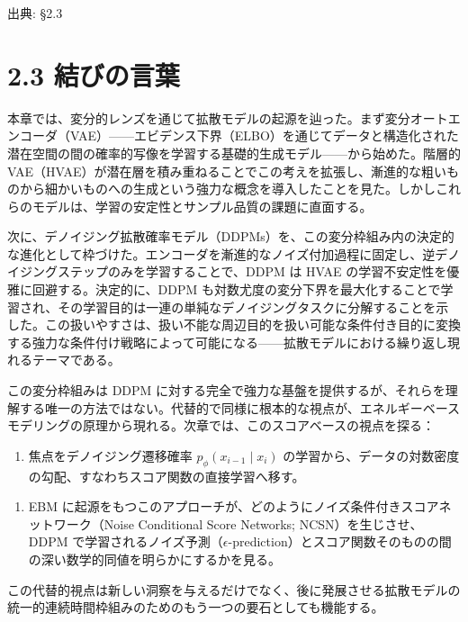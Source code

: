 

{\color{gray}\footnotesize 出典: §2.3\par}
\vspace{0.2em}

\section*{2.3 結びの言葉}


本章では、変分的レンズを通じて拡散モデルの起源を辿った。まず変分オートエンコーダ（VAE）——エビデンス下界（ELBO）を通じてデータと構造化された潜在空間の間の確率的写像を学習する基礎的生成モデル——から始めた。階層的 VAE（HVAE）が潜在層を積み重ねることでこの考えを拡張し、漸進的な粗いものから細かいものへの生成という強力な概念を導入したことを見た。しかしこれらのモデルは、学習の安定性とサンプル品質の課題に直面する。

次に、デノイジング拡散確率モデル（DDPMs）を、この変分枠組み内の決定的な進化として枠づけた。エンコーダを漸進的なノイズ付加過程に固定し、逆デノイジングステップのみを学習することで、DDPM は HVAE の学習不安定性を優雅に回避する。決定的に、DDPM も対数尤度の変分下界を最大化することで学習され、その学習目的は一連の単純なデノイジングタスクに分解することを示した。この扱いやすさは、扱い不能な周辺目的を扱い可能な条件付き目的に変換する強力な条件付け戦略によって可能になる——拡散モデルにおける繰り返し現れるテーマである。

この変分枠組みは DDPM に対する完全で強力な基盤を提供するが、それらを理解する唯一の方法ではない。代替的で同様に根本的な視点が、エネルギーベースモデリングの原理から現れる。次章では、このスコアベースの視点を探る：

\begin{enumerate}
\item 焦点をデノイジング遷移確率 $p_\phi(x_{i-1}\mid x_i)$ の学習から、データの対数密度の勾配、すなわちスコア関数の直接学習へ移す。
\end{enumerate}


\begin{enumerate}
\item EBM に起源をもつこのアプローチが、どのようにノイズ条件付きスコアネットワーク（Noise Conditional Score Networks; NCSN）を生じさせ、DDPM で学習されるノイズ予測（$\epsilon$-prediction）とスコア関数そのものの間の深い数学的同値を明らかにするかを見る。
\end{enumerate}


この代替的視点は新しい洞察を与えるだけでなく、後に発展させる拡散モデルの統一的連続時間枠組みのためのもう一つの要石としても機能する。

